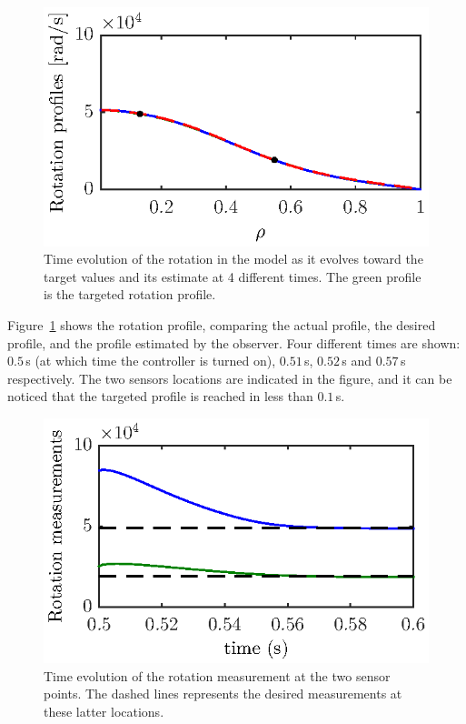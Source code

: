 \documentclass{iopart}
\begin{document}
\begin{figure}
	\includegraphics{fig12d} %
	\caption{Time evolution of the rotation in the model as it evolves toward the target values and its estimate at 4 different times. The green profile is the targeted rotation profile. }
	\label{fig:rot18}
\end{figure}


Figure~\ref{fig:rot18} shows the rotation profile, comparing the actual profile, the desired profile, and the profile estimated by the observer.  Four different times are shown: $0.5$\,s (at which time the controller is turned on), $0.51$\,s, $0.52$\,s and $0.57$\,s respectively. The two sensors locations are indicated in the figure, and it can be noticed that the targeted profile is reached in less than $0.1$\,s.
\begin{figure}
\centering
\includegraphics{fig13} %
\caption{Time evolution of the rotation measurement at the two sensor points. The dashed lines represents the desired measurements at these latter locations. }
\label{fig:rot20}
\end{figure}    
\end{document}
